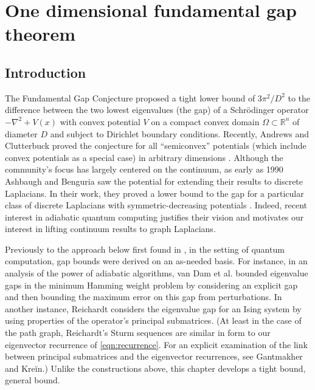 
\newtheorem{fact}{Fact}

\DeclarePairedDelimiter\size{\lvert}{\rvert}
\newcommand{\graph}[2]{\mathbb{#1}_{#2}}
\newcommand{\intset}[2]{\left \llbracket #1 , #2 \right \rrbracket}

\chapter{One dimensional fundamental gap theorem}\label{chap:fundamental_gap}

\section{Introduction}
  The Fundamental Gap Conjecture proposed a tight lower bound of $3\pi^2/D^2$ to the difference between the two lowest eigenvalues (the gap) of a Schr\"{o}dinger operator $-\nabla^2 + V(x)$ with convex potential $V$ on a compact convex domain $\Omega \subset \mathbb{R}^n$ of diameter $D$ and subject to Dirichlet boundary conditions. Recently, Andrews and Clutterbuck proved the conjecture for all ``semiconvex'' potentials (which include convex potentials as a special case) in arbitrary dimensions \cite{Andrews2011}. Although the community's focus has largely centered on the continuum\cite{Andrews2011, Lavine1994, ashbaugh1989optimal, Yu1986}, as early as 1990 Ashbaugh and Benguria saw the potential for extending their results to discrete Laplacians. In their work, they proved a lower bound to the gap for a particular class of discrete Laplacians with symmetric-decreasing potentials \cite{ashbaugh1990some}. Indeed, recent interest in adiabatic quantum computing justifies their vision and motivates our interest in lifting continuum results to graph Laplacians\cite{Farhi_science, FGG02}.

  Previously to the approach below first found in \cite{Jarret2014c}, in the setting of quantum computation, gap bounds were derived on an as-needed basis. For instance, in an analysis of the power of adiabatic algorithms, van Dam et al. bounded eigenvalue gaps in the minimum Hamming weight problem by considering an explicit gap and then bounding the maximum error on this gap from perturbations\cite{DMV01}. In another instance, Reichardt considers the eigenvalue gap for an Ising system by using properties of the operator's principal submatrices\cite{R04}. (At least in the case of the path graph, Reichardt's Sturm sequences are similar in form to our eigenvector recurrence of \cref{eqn:recurrence}. For an explicit examination of the link between principal submatrices and the eigenvector recurrences, see Gantmakher and Kre\u{i}n\cite{gantmakher2002oscillation}.) Unlike the constructions above, this chapter develops a tight bound, general bound. 
  
